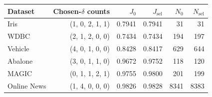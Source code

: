 \begin{table}
\label{tab:validation-selection}
\begin{tabular}{lrrrrr}
\toprule
Dataset & Chosen-$\delta$ counts & $J_0$ & $J_{\mathrm{sel}}$ & $N_0$ & $N_{\mathrm{sel}}$ \\
\midrule
Iris & (1, 0, 2, 1, 1) & 0.7941 & 0.7941 & 31 & 31 \\
WDBC & (2, 1, 2, 0, 0) & 0.7434 & 0.7434 & 194 & 197 \\
Vehicle & (4, 0, 1, 0, 0) & 0.8428 & 0.8417 & 629 & 644 \\
Abalone & (3, 0, 1, 1, 0) & 0.9672 & 0.9752 & 118 & 120 \\
MAGIC & (0, 1, 1, 2, 1) & 0.9755 & 0.9800 & 201 & 199 \\
Online News & (1, 4, 0, 0, 0) & 0.9826 & 0.9828 & 8341 & 8383 \\
\bottomrule
\end{tabular}
\end{table}
